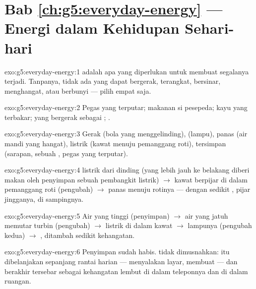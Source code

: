 \section*{Bab \ref{ch:g5:everyday-energy} --- Energi dalam Kehidupan Sehari-hari}

\begin{solution}{exo:g5:everyday-energy:1}
 adalah apa yang diperlukan untuk membuat segalanya terjadi.
Tanpanya, tidak ada yang dapat bergerak, terangkat, bersinar,
menghangat, atau berbunyi --- pilih empat saja.
\end{solution}

\begin{solution}{exo:g5:everyday-energy:2}
Pegas yang terputar; makanan si pesepeda; kayu yang terbakar; 
yang bergerak sebagai ; .
\end{solution}

\begin{solution}{exo:g5:everyday-energy:3}
Gerak (bola yang menggelinding),  (lampu), panas (air mandi yang
hangat), listrik (kawat menuju pemanggang roti), tersimpan (sarapan,
sebuah , pegas yang terputar).
\end{solution}

\begin{solution}{exo:g5:everyday-energy:4}
 listrik dari dinding (yang lebih jauh ke belakang diberi makan
oleh penyimpan sebuah pembangkit listrik) $\to$ kawat berpijar di
dalam pemanggang roti (pengubah) $\to$ panas menuju rotinya --- dengan
sedikit , pijar jingganya, di sampingnya.
\end{solution}

\begin{solution}{exo:g5:everyday-energy:5}
Air yang tinggi (penyimpan) $\to$ air yang jatuh memutar turbin
(pengubah) $\to$  listrik di dalam kawat $\to$ lampunya
(pengubah kedua) $\to$ , ditambah sedikit kehangatan.
\end{solution}

\begin{solution}{exo:g5:everyday-energy:6}
Penyimpan  sudah habis.  tidak dimusnahkan: 
itu dibelanjakan sepanjang rantai harian --- menyalakan layar, membuat
 --- dan berakhir tersebar sebagai kehangatan lembut di dalam
teleponnya dan di dalam ruangan.
\end{solution}

